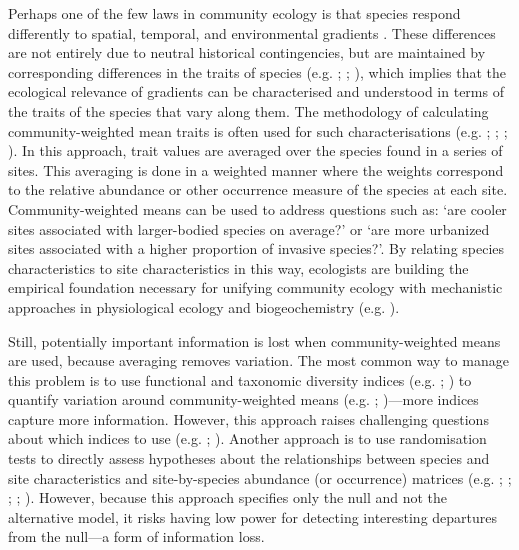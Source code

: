 \documentclass[12pt]{ecology}
\begin{document}
Perhaps one of the few laws in community ecology is that species respond differently to spatial, temporal, and environmental gradients \citep{Gleason1917,Whittaker1967}.  These differences are not entirely due to neutral historical contingencies, but are maintained by corresponding differences in the traits of species (e.g. ; ; ), which implies that the ecological relevance of gradients can be characterised and understood in terms of the traits of the species that vary along them.  The methodology of calculating community-weighted mean traits is often used for such characterisations (e.g. ; ; ; ).  In this approach, trait values are averaged over the species found in a series of sites.  This averaging is done in a weighted manner where the weights correspond to the relative abundance or other occurrence measure of the species at each site.  Community-weighted means can be used to address questions such as:  `are cooler sites associated with larger-bodied species on average?' or `are more urbanized sites associated with a higher proportion of invasive species?'.  By relating species characteristics to site characteristics in this way, ecologists are building the empirical foundation necessary for unifying community ecology with mechanistic approaches in physiological ecology and biogeochemistry (e.g. ).

Still, potentially important information is lost when community-weighted means are used, because averaging removes variation.  The most common way to manage this problem is to use functional and taxonomic diversity indices (e.g. ; ) to quantify variation around community-weighted means (e.g. ; )---more indices capture more information.  However, this approach raises challenging questions about which indices to use (e.g. ; ).  Another approach is to use randomisation tests to directly assess hypotheses about the relationships between species and site characteristics and site-by-species abundance (or occurrence) matrices (e.g. ; ; ; ; ).  However, because this approach specifies only the null and not the alternative model, it risks having low power for detecting interesting departures from the null---a form of information loss.
\end{document}
